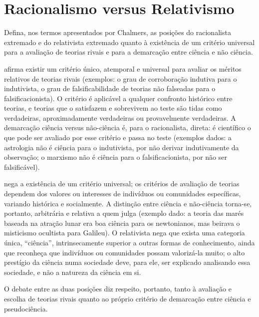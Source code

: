 \documentclass[10pt]{extarticle}
\newcommand{\resposta}[1]{\par\smallskip\noindent #1}
\begin{document}
\section*{Racionalismo versus Relativismo}
\begin{questoes}

\item Defina, nos termos apresentados por Chalmers, as posições do racionalista extremado e do relativista extremado quanto à existência de um critério universal para a avaliação de teorias rivais e para a demarcação entre ciência e não ciência.

\resposta{
\begin{topicos}
\item[Racionalista extremado:] afirma existir um critério único, atemporal e universal para avaliar os méritos relativos de teorias rivais (exemplos: o grau de corroboração indutiva para o indutivista, o grau de falsificabilidade de teorias não falseadas para o falsificacionista). O critério é aplicável a qualquer confronto histórico entre teorias, e teorias que o satisfazem e sobrevivem ao teste são tidas como verdadeiras, aproximadamente verdadeiras ou provavelmente verdadeiras. A demarcação ciência versus não-ciência é, para o racionalista, direta: é científico o que pode ser avaliado por esse critério e passa no teste (exemplos dados: a astrologia não é ciência para o indutivista, por não derivar indutivamente da observação; o marxismo não é ciência para o falsificacionista, por não ser falsificável).
\item[Relativista extremado:] nega a existência de um critério universal; os critérios de avaliação de teorias dependem dos valores ou interesses de indivíduos ou comunidades específicas, variando histórica e socialmente. A distinção entre ciência e não-ciência torna-se, portanto, arbitrária e relativa a quem julga (exemplo dado: a teoria das marés baseada na atração lunar era boa ciência para os newtonianos, mas beirava o misticismo ocultista para Galileu). O relativista nega que exista uma categoria única, \enquote{ciência}, intrinsecamente superior a outras formas de conhecimento, ainda que reconheça que indivíduos ou comunidades possam valorizá-la muito; o alto prestígio da ciência numa sociedade deve, para ele, ser explicado analisando essa sociedade, e não a natureza da ciência em si.
\item O debate entre as duas posições diz respeito, portanto, tanto à avaliação e escolha de teorias rivais quanto ao próprio critério de demarcação entre ciência e pseudociência.
\end{topicos}
}


\end{questoes}
\end{document}
